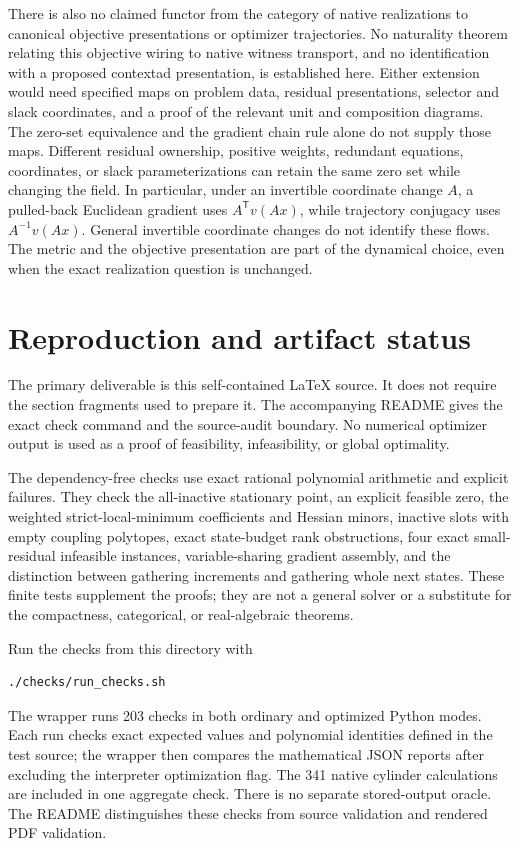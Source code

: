 \documentclass[11pt]{article}
\theoremstyle{remark}
\begin{document}
There is also no claimed functor from the category of native realizations to canonical objective presentations or optimizer trajectories. No naturality theorem relating this objective wiring to native witness transport, and no identification with a proposed contextad presentation, is established here. Either extension would need specified maps on problem data, residual presentations, selector and slack coordinates, and a proof of the relevant unit and composition diagrams. The zero-set equivalence and the gradient chain rule alone do not supply those maps. Different residual ownership, positive weights, redundant equations, coordinates, or slack parameterizations can retain the same zero set while changing the field. In particular, under an invertible coordinate change $A$, a pulled-back Euclidean gradient uses $A^{\mathsf T}v(Ax)$, while trajectory conjugacy uses $A^{-1}v(Ax)$. General invertible coordinate changes do not identify these flows. The metric and the objective presentation are part of the dynamical choice, even when the exact realization question is unchanged.

\section{Reproduction and artifact status}\label{sec:reproduction}

The primary deliverable is this self-contained \LaTeX{} source. It does not require the section fragments used to prepare it. The accompanying README gives the exact check command and the source-audit boundary. No numerical optimizer output is used as a proof of feasibility, infeasibility, or global optimality.

The dependency-free checks use exact rational polynomial arithmetic and explicit failures. They check the all-inactive stationary point, an explicit feasible zero, the weighted strict-local-minimum coefficients and Hessian minors, inactive slots with empty coupling polytopes, exact state-budget rank obstructions, four exact small-residual infeasible instances, variable-sharing gradient assembly, and the distinction between gathering increments and gathering whole next states. These finite tests supplement the proofs; they are not a general solver or a substitute for the compactness, categorical, or real-algebraic theorems.

Run the checks from this directory with
\begin{verbatim}
./checks/run_checks.sh
\end{verbatim}
The wrapper runs 203 checks in both ordinary and optimized Python modes. Each run checks exact expected values and polynomial identities defined in the test source; the wrapper then compares the mathematical JSON reports after excluding the interpreter optimization flag. The 341 native cylinder calculations are included in one aggregate check. There is no separate stored-output oracle. The README distinguishes these checks from source validation and rendered PDF validation.
\end{document}
